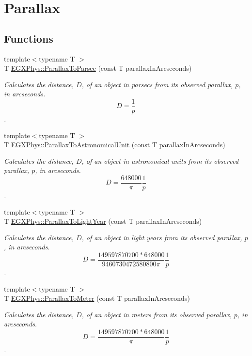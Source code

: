 \hypertarget{group___e_g_x_phys-_astrophysic-_parallax}{}\section{Parallax}
\label{group___e_g_x_phys-_astrophysic-_parallax}
\subsection*{Functions}
\begin{DoxyCompactItemize}
\item 
{\footnotesize template$<$typename T $>$ }\\T \mbox{\hyperlink{group___e_g_x_phys-_astrophysic-_parallax_gab42dbec142e1a47925fc45e899845861}{E\+G\+X\+Phys\+::\+Parallax\+To\+Parsec}} (const T parallax\+In\+Arcseconds)
\begin{DoxyCompactList}\small\item\em Calculates the distance, $D$, of an object in parsecs from its observed parallax, $p$, in arcseconds. \[ D=\dfrac{1}{p}\]. \end{DoxyCompactList}\item 
{\footnotesize template$<$typename T $>$ }\\T \mbox{\hyperlink{group___e_g_x_phys-_astrophysic-_parallax_gaee6df9899f30baa3d659597abe89066a}{E\+G\+X\+Phys\+::\+Parallax\+To\+Astronomical\+Unit}} (const T parallax\+In\+Arcseconds)
\begin{DoxyCompactList}\small\item\em Calculates the distance, $D$, of an object in astronomical units from its observed parallax, $p$, in arcseconds. \[ D=\dfrac{648000}{\pi}\dfrac{1}{p}\]. \end{DoxyCompactList}\item 
{\footnotesize template$<$typename T $>$ }\\T \mbox{\hyperlink{group___e_g_x_phys-_astrophysic-_parallax_gacaec31498f264e2a1dc285062a394de2}{E\+G\+X\+Phys\+::\+Parallax\+To\+Light\+Year}} (const T parallax\+In\+Arcseconds)
\begin{DoxyCompactList}\small\item\em Calculates the distance, $D$, of an object in light years from its observed parallax, $p$, in arcseconds. \[ D=\dfrac{149597870700 * 648000}{9460730472580800 \pi} \dfrac{1}{p}\]. \end{DoxyCompactList}\item 
{\footnotesize template$<$typename T $>$ }\\T \mbox{\hyperlink{group___e_g_x_phys-_astrophysic-_parallax_ga94912bf8b98a04cccab8ef19eaa89b6a}{E\+G\+X\+Phys\+::\+Parallax\+To\+Meter}} (const T parallax\+In\+Arcseconds)
\begin{DoxyCompactList}\small\item\em Calculates the distance, $D$, of an object in meters from its observed parallax, $p$, in arcseconds. \[ D=\dfrac{149597870700 * 648000}{\pi}\dfrac{1}{p}\]. \end{DoxyCompactList}\end{DoxyCompactItemize}


